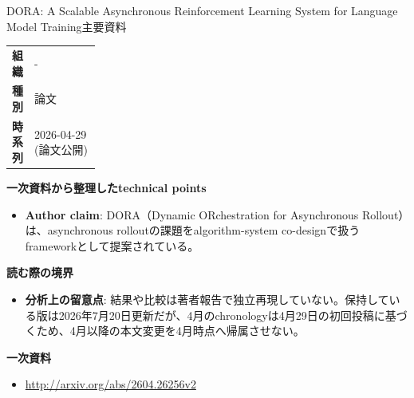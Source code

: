 \begin{technicalnote}{DORA: A Scalable Asynchronous Reinforcement Learning System for Language Model Training}{主要資料}
\begingroup
\begin{tabularx}{\linewidth}{@{}>{\bfseries}p{0.22\linewidth}X@{}}
組織 & - \\
種別 & 論文 \\
時系列 & 2026-04-29 (論文公開) \\
\end{tabularx}
\smallskip
{\bfseries 一次資料から整理したtechnical points}
\begin{itemize}[leftmargin=1.5em,itemsep=0.35em]
\item \textbf{Author claim}: DORA（Dynamic ORchestration for Asynchronous Rollout）は、asynchronous rolloutの課題をalgorithm-system co-designで扱うframeworkとして提案されている。
\end{itemize}
\begin{minipage}{\linewidth}
{\bfseries 読む際の境界}
\begin{itemize}[leftmargin=1.5em,itemsep=0.35em]
\item \textbf{分析上の留意点}: 結果や比較は著者報告で独立再現していない。保持している版は2026年7月20日更新だが、4月のchronologyは4月29日の初回投稿に基づくため、4月以降の本文変更を4月時点へ帰属させない。
\end{itemize}
\begin{samepage}
{\bfseries 一次資料}
\begingroup\sloppy
\begin{itemize}[leftmargin=1.5em,itemsep=0.25em]
\item {\scriptsize\url{http://arxiv.org/abs/2604.26256v2}}
\end{itemize}
\endgroup
\end{samepage}
\end{minipage}
\endgroup
\end{technicalnote}
\medskip

